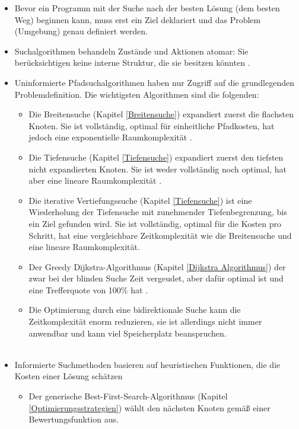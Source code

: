 \begin{itemize}
    \item Bevor ein Programm mit der Suche nach der besten Lösung (dem besten Weg) beginnen kann, muss erst ein Ziel deklariert und das Problem (Umgebung) genau definiert werden.
    \item Suchalgorithmen behandeln Zustände und Aktionen atomar: Sie berücksichtigen keine interne Struktur, die sie besitzen könnten \cite{Russell:10d}.
    \item Uninformierte Pfadsuchalgorithmen haben nur Zugriff auf die grundlegenden Problemdefinition. Die wichtigsten Algorithmen sind die folgenden:
    \begin{itemize}
        \item Die Breitensuche (Kapitel \ref{Breitensuche}) expandiert zuerst die flachsten Knoten. Sie ist vollständig, optimal für einheitliche Pfadkosten, hat jedoch eine exponentielle Raumkomplexität \cite{Russell:10b}.
        \item Die Tiefensuche (Kapitel \ref{Tiefensuche}) expandiert zuerst den tiefsten nicht expandierten Knoten. Sie ist weder vollständig noch optimal, hat aber eine lineare Raumkomplexität \cite{Russell:10c}.
        \item Die iterative Vertiefungssuche (Kapitel \ref{Tiefensuche}) ist eine Wiederholung der Tiefensuche mit zunehmender Tiefenbegrenzung, bis ein Ziel gefunden wird. Sie ist vollständig, optimal für die Kosten pro Schritt, hat eine vergleichbare Zeitkomplexität wie die Breitensuche und eine lineare Raumkomplexität\cite{Russell:10c}.
        \item Der Greedy Dijkstra-Algorithmus (Kapitel \ref{Dijkstra Algorithmus}) der zwar bei der blinden Suche Zeit vergeudet, aber dafür optimal ist und eine Trefferquote von 100\% hat \cite{Karur:21}.
        \item Die Optimierung durch eine bidirektionale Suche kann die Zeitkomplexität enorm reduzieren, sie ist allerdings nicht immer anwendbar und kann viel Speicherplatz beanspruchen.\\\\
    \end{itemize}
    \item Informierte Suchmethoden basieren auf heuristischen Funktionen, die die Kosten einer Lösung schätzen
    \begin{itemize}
        \item Der generische Best-First-Search-Algorithmus (Kapitel \ref{Optimierungsstrategien}) wählt den nächsten Knoten gemäß einer Bewertungsfunktion aus.

\end{itemize}
\end{itemize}
